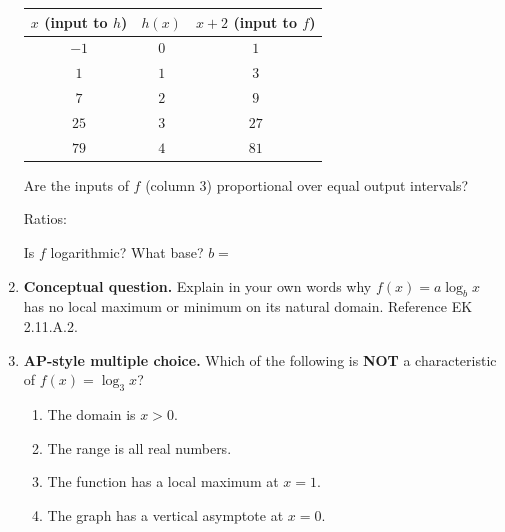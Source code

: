 \documentclass[10pt]{article}
\begin{document}
\begin{enumerate}[leftmargin=1.8em, itemsep=14pt]
\vspace{6pt}
\begin{center}
\renewcommand{\arraystretch}{1.8}
\begin{tabular}{|c|c|c|}
\hline
\rowcolor{sky}
$x$ (input to $h$) & $h(x)$ & $x + 2$ (input to $f$) \\
\hline
$-1$ & $0$ & $1$ \\
\hline
$1$  & $1$ & $3$ \\
\hline
$7$  & $2$ & $9$ \\
\hline
$25$ & $3$ & $27$ \\
\hline
$79$ & $4$ & $81$ \\
\hline
\end{tabular}
\end{center}

\vspace{6pt}
Are the inputs of $f$ (column 3) proportional over equal output intervals?

\vspace{4pt}
Ratios: \blank{6cm}

\vspace{4pt}
Is $f$ logarithmic? \blank{2cm} \quad What base? $b = $ \blank{2cm}

\item \textbf{Conceptual question.} Explain in your own words why $f(x) = a\log_b x$ has
      no local maximum or minimum on its natural domain. Reference EK 2.11.A.2.


\item \textbf{AP-style multiple choice.} Which of the following is \textbf{NOT} a
      characteristic of $f(x) = \log_3 x$?

\vspace{6pt}
\begin{enumerate}[leftmargin=2em, itemsep=4pt, label=(\Alph*)]
  \item The domain is $x > 0$.
  \item The range is all real numbers.
  \item The function has a local maximum at $x = 1$.
  \item The graph has a vertical asymptote at $x = 0$.
\end{enumerate}

\end{enumerate}

\vspace{0.12in}
\end{document}
